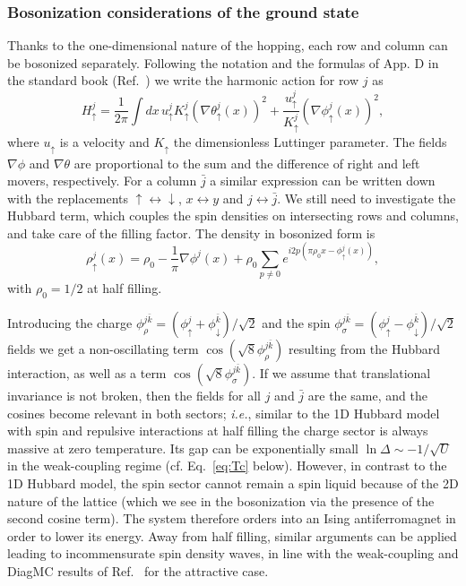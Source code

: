 \documentclass[twocolumn,superscriptaddress,pra,showpacs,longbibliography]{revtex4-1}
\newcommand{\<}{\langle}
\renewcommand{\>}{\rangle}
\begin{document}
\subsubsection{Bosonization considerations of the ground state}

Thanks to the one-dimensional nature of the hopping, each row and column can be bosonized separately. Following the notation and the formulas of App. D in the standard book (Ref.~\cite{Giamarchi_book}) we write the harmonic action for  row $j$ as
\begin{equation}
H_{\uparrow}^j = \frac{1}{2 \pi} \int dx \, u_{\uparrow}^j K_{\uparrow}^j ( \nabla \theta^j_{\uparrow}(x))^2 + \frac{u_{\uparrow}^j}{K_{\uparrow}^j}( \nabla \phi^j_{\uparrow}(x))^2,
\end{equation}
where $u_{\uparrow}$ is a velocity and $K_{\uparrow} $ the dimensionless Luttinger parameter. The fields $\nabla \phi$ and $\nabla \theta$ are proportional to the sum and the difference of right and left movers, respectively. For a column $\bar{j}$ a similar expression can be written down with the replacements ${\uparrow} \leftrightarrow {\downarrow}$, $x \leftrightarrow y$ and $j \leftrightarrow \bar{j}$. We still need to investigate the Hubbard term, which couples the spin densities on intersecting rows and columns, and take care of the filling factor. The density in bosonized form is
\begin{equation}
\rho_{\uparrow}^j(x) = \rho_0 - \frac{1}{\pi} \nabla \phi^j(x) + \rho_0 \sum_{p \neq 0} e^{i 2 p (\pi \rho_0 x - \phi^j_{\uparrow}(x))},
\end{equation}
with $\rho_0 = 1/2$ at half filling. %


Introducing the charge $\phi^{j \bar{k}}_{\rho} = (\phi^{j}_{\uparrow} + \phi^{\bar{k}}_{\downarrow} )/\sqrt{2}$ and the spin $\phi^{j \bar{k} }_{\sigma} = (\phi^{j}_{\uparrow} - \phi^{\bar{k}}_{\downarrow} )/\sqrt{2}$ fields we get a non-oscillating term $\cos(\sqrt{8} \phi^{j \bar{k}}_{\rho})$ resulting from the Hubbard interaction, as well as a term $\cos(\sqrt{8} \phi^{j \bar{k}}_{\sigma})$.
If we assume that translational invariance is not broken, then the fields for all $j$ and $\bar{j}$ are the same, and the cosines become relevant in both sectors; {\it i.e.}, similar to the 1D Hubbard model with spin and repulsive interactions at half filling  the charge sector is always massive at zero temperature. Its gap can be exponentially small $\ln \Delta \sim -1/\sqrt{U}$ in the weak-coupling regime (cf. Eq.~\eqref{eq:Tc} below). However, in contrast to the 1D Hubbard model, the spin sector cannot remain a spin liquid because of the 2D nature of the lattice (which we see in the bosonization via the presence of the second cosine term). The system therefore orders into an Ising antiferromagnet in order to lower its energy.
Away from half filling, similar arguments can be applied leading to incommensurate spin density waves, in line with the weak-coupling and DiagMC results of Ref.~\cite{Gukelberger:2014dba} for the attractive case.
\end{document}
